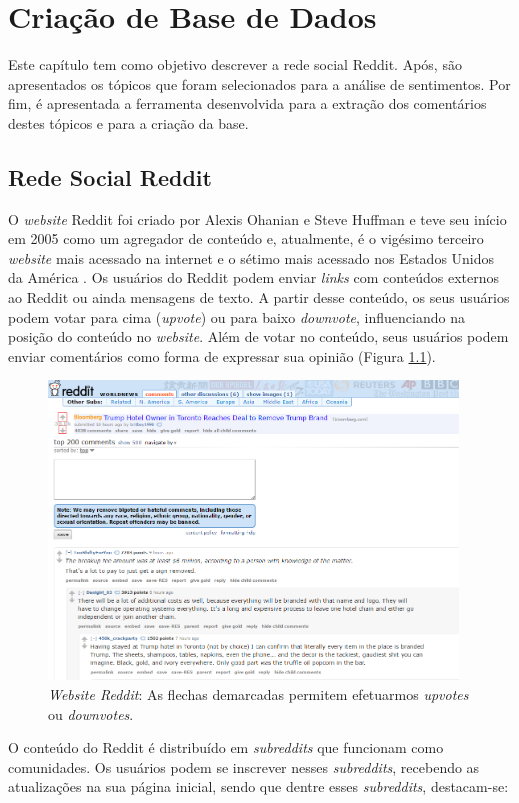 \chapter{Criação de Base de Dados}
\label{cap:banco}
Este capítulo tem como objetivo descrever a rede social Reddit.
Após, são apresentados os tópicos que foram selecionados para a análise de
sentimentos. Por fim, é apresentada a ferramenta desenvolvida para a extração
dos comentários destes tópicos e para a criação da base.
\section{Rede Social Reddit}
\label{cap:Reddit}

O \textit{website} Reddit foi criado por Alexis Ohanian e Steve Huffman e teve
seu início em 2005 como um agregador de conteúdo e, atualmente, é o vigésimo terceiro \textit{website} mais acessado na
internet e o sétimo mais acessado nos Estados Unidos da América \cite{alexa}.
Os usuários do Reddit podem enviar \textit{links} com conteúdos externos
ao Reddit ou ainda mensagens de texto. A partir desse conteúdo, os seus
usuários podem votar para cima (\textit{upvote}) ou para baixo \textit{downvote},
influenciando na posição do conteúdo no \textit{website}. Além de votar no conteúdo, seus usuários podem enviar comentários como
forma de expressar sua opinião (Figura \ref{fig:reddit}).


\begin{figure}[!htbp]
\centering
\includegraphics[height=300px]{imagens/reddit.png}
\caption{\textit{Website Reddit}:  As flechas demarcadas permitem efetuarmos
\textit{upvotes} ou \textit{downvotes}.}
\label{fig:reddit}
\end{figure}

O conteúdo do Reddit é distribuído em \textit{subreddits} que funcionam como
comunidades. Os usuários podem se inscrever nesses
\textit{subreddits}, recebendo as atualizações na sua página inicial, sendo
que dentre esses \textit{subreddits}, destacam-se:


